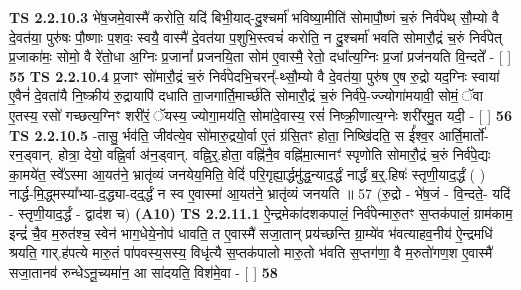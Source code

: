 \documentclass[17pt]{extarticle}
\begin{document}
                  \newline
                                \textbf{ TS 2.2.10.3} \newline
                  भे॑ष॒जमे॒वास्मै॑ करोति॒ यदि॑ बिभी॒याद्-दु॒श्चर्मा॑ भविष्या॒मीति॑ सोमापौ॒ष्णं च॒रुं निर्व॑पेथ् सौ॒म्यो वै दे॒वत॑या॒ पुरु॑षः पौ॒ष्णाः प॒शवः॒ स्वयै॒ वास्मै॑ दे॒वत॑या प॒शुभि॒स्त्वचं॑ करोति॒ न दु॒श्चर्मा॑ भवति सोमारौ॒द्रं च॒रुं निर्व॑पेत् प्र॒जाका॑मः॒ सोमो॒ वै रे॑तो॒धा अ॒ग्निः प्र॒जानां᳚ प्रजनयि॒ता सोम॑ ए॒वास्मै॒ रेतो॒ दधा᳚त्य॒ग्निः प्र॒जां प्रज॑नयति वि॒न्दते᳚ - [  ] \textbf{  55} \newline
                  \newline
                                \textbf{ TS 2.2.10.4} \newline
                  प्र॒जाꣳ सो॑मारौ॒द्रं च॒रुं निर्व॑पेदभि॒चरन्᳚-थ्सौ॒म्यो वै दे॒वत॑या॒ पुरु॑ष ए॒ष रु॒द्रो यद॒ग्निः स्वाया॑ ए॒वैनं॑ दे॒वता॑यै नि॒ष्क्रीय॑ रु॒द्रायापि॑ दधाति ता॒जगार्ति॒मार्च्छ॑ति सोमारौ॒द्रं च॒रुं निर्व॑पे॒-ज्ज्योगा॑मयावी॒ सोमं॒ ॅवा ए॒तस्य॒ रसो॑ गच्छत्य॒ग्निꣳ शरी॑रं॒ ॅयस्य॒ ज्योगा॒मय॑ति॒ सोमा॑दे॒वास्य॒ रसं॑ निष्क्री॒णात्य॒ग्नेः शरी॑रमु॒त यदी॒ - [  ] \textbf{  56} \newline
                  \newline
                                \textbf{ TS 2.2.10.5} \newline
                   \textbf{ } \newline
                  \newline
                      -तासु॒ र्भव॑ति॒ जीव॑त्ये॒व सो॑मारु॒द्रयो॒र्वा ए॒तं ग्र॑सि॒तꣳ होता॒ निष्खि॑दति॒ स ई᳚श्व॒र आर्ति॒मार्तो॑-रन॒ड्वान्. होत्रा॒ देयो॒ वह्नि॒र्वा अ॑न॒ड्वान्. वह्नि॒र्॒.होता॒ वह्नि॑नै॒व वह्नि॑मा॒त्मानꣳ॑ स्पृणोति सोमारौ॒द्रं च॒रुं निर्व॑पे॒द्यः का॒मये॑त॒ स्वे᳚ऽस्मा आ॒यत॑ने॒ भ्रातृ॑व्यं जनयेय॒मिति॒ वेदिं॑ परि॒गृह्या॒र्द्धमु॑द्ध॒न्याद॒र्द्धं नार्द्धं ब॒र्॒.हिषः॑ स्तृणी॒याद॒र्द्धं ( ) नार्द्ध-मि॒द्ध्मस्या᳚भ्या-द॒द्ध्या-दद्॒र्द्धं न स्व ए॒वास्मा॑ आ॒यत॑ने॒ भ्रातृ॑व्यं जनयति ॥ 57 (रु॒द्रो - भे॑ष॒जं - वि॒न्दते॒- यदि॑ - स्तृणी॒याद॒र्द्धं - द्वाद॑श च)  \textbf{(A10)} \newline \newline
                                        \textbf{ TS 2.2.11.1} \newline
                  ऐ॒न्द्रमेका॑दशकपालं॒ निर्व॑पेन्मारु॒तꣳ स॒प्तक॑पालं॒ ग्राम॑काम॒ इन्द्रं॑ चै॒व म॒रुत॑श्च॒ स्वेन॑ भाग॒धेये॒नोप॑ धावति॒ त ए॒वास्मै॑ सजा॒तान् प्रय॑च्छन्ति ग्रा॒म्ये॑व भ॑वत्याहव॒नीय॑ ऐ॒न्द्रमधि॑ श्रयति॒ गार्.ह॑पत्ये मारु॒तं पा॑पवस्य॒सस्य॒ विधृ॑त्यै स॒प्तक॑पालो मारु॒तो भ॑वति स॒प्तग॑णा॒ वै म॒रुतो॑गण॒श ए॒वास्मै॑ सजा॒तानव॑ रुन्धेऽनू॒च्यमा॑न॒ आ सा॑दयति॒ विश॑मे॒वा - [  ] \textbf{  58} \newline
\end{document}
